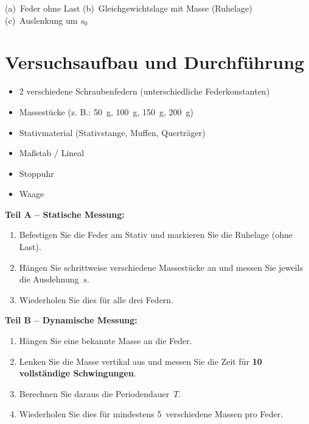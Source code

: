\documentclass[11pt,a4paper]{scrartcl}
\begin{document}
\begin{center}
	\vspace{0.2cm}
	\small (a)~Feder ohne Last \quad (b)~Gleichgewichtslage mit Masse (Ruhelage) \quad (c)~Auslenkung um $s_0$
\end{center}

\section*{Versuchsaufbau und Durchführung}

\begin{materialbox}
	\begin{itemize}
		\item 2 verschiedene Schraubenfedern (unterschiedliche Federkonstanten)
		\item Massestücke (z. B.: \SI{50}{g}, \SI{100}{g}, \SI{150}{g}, \SI{200}{g})
		\item Stativmaterial (Stativstange, Muffen, Querträger)
		\item Maßstab / Lineal
		\item Stoppuhr
		\item Waage
	\end{itemize}
\end{materialbox}

\begin{hilfebox}[title={\faIcon{lightbulb} Durchführung}]
	\textbf{Teil A -- Statische Messung:}
	\begin{enumerate}
		\item Befestigen Sie die Feder am Stativ und markieren Sie die Ruhelage (ohne Last).
		\item Hängen Sie schrittweise verschiedene Massestücke an und messen Sie jeweils die Ausdehnung~$s$.
		\item Wiederholen Sie dies für alle drei Federn.
	\end{enumerate}

	\vspace{0.3cm}
	\textbf{Teil B -- Dynamische Messung:}
	\begin{enumerate}
		\item Hängen Sie eine bekannte Masse an die Feder.
		\item Lenken Sie die Masse vertikal aus und messen Sie die Zeit für \textbf{10 vollständige Schwingungen}.
		\item Berechnen Sie daraus die Periodendauer~$T$.
		\item Wiederholen Sie dies für mindestens 5~verschiedene Massen pro Feder.
	\end{enumerate}
\end{hilfebox}
\end{document}
